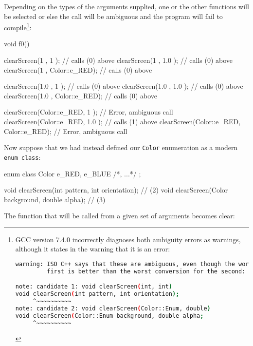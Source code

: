 \noindent Depending on the types of the arguments supplied, one or the other
functions will be selected or else the call will be ambiguous and the
program will fail to compile{\cprotect\footnote{GCC version 7.4.0
incorrectly diagnoses both ambiguity errors as warnings, although it
states in the warning that it is an error:

\begin{lstlisting}[language=bash,basicstyle={\ttfamily\footnotesize}]
warning: ISO C++ says that these are ambiguous, even though the worst conversion for the
         first is better than the worst conversion for the second:

note: candidate 1: void clearScreen(int, int)
void clearScreen(int pattern, int orientation);
     ^~~~~~~~~~~
note: candidate 2: void clearScreen(Color::Enum, double)
void clearScreen(Color::Enum background, double alpha;
     ^~~~~~~~~~~
\end{lstlisting}
      }}:

\begin{emcppslisting}[emcppsbatch=e7]
void f0()
{
    clearScreen(1           , 1           );  // calls (0) above
    clearScreen(1           , 1.0         );  // calls (0) above
    clearScreen(1           , Color::e_RED);  // calls (0) above

    clearScreen(1.0         , 1           );  // calls (0) above
    clearScreen(1.0         , 1.0         );  // calls (0) above
    clearScreen(1.0         , Color::e_RED);  // calls (0) above

    clearScreen(Color::e_RED, 1           );  // Error, ambiguous call
    clearScreen(Color::e_RED, 1.0         );  // calls (1) above
    clearScreen(Color::e_RED, Color::e_RED);  // Error, ambiguous call
}
\end{emcppslisting}

\noindent Now suppose that we had instead defined our \texttt{Color} enumeration
as a modern \texttt{enum}~\texttt{class}:

\begin{emcppslisting}[emcppsbatch=e8]
enum class Color { e_RED, e_BLUE /*, ...*/ };

void clearScreen(int pattern, int orientation);    // (2)
void clearScreen(Color background, double alpha);  // (3)
\end{emcppslisting}

\noindent The function that will be called from a given set of arguments becomes
clear:

